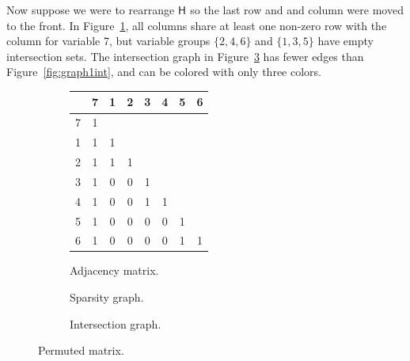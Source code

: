 \documentclass[jss]{jss}\usepackage[]{graphicx}\usepackage[]{color}
\newcommand{\hess}[2]{\mathsf{H}_{#1}#2}
\begin{document}
Now suppose we were to rearrange $\hess{}{}$ so the last row and
and column were moved to the front.  In Figure~\ref{fig:graph2adj}, all columns share at least one non-zero row with
the column for variable 7, but variable groups $\{2,4,6\}$ and
$\{1,3,5\}$ have empty intersection sets.  The intersection graph in
Figure~\ref{fig:graph2int} has fewer edges than Figure~\ref{fig:graph1int}, and can be colored
with only three colors.
\begin{figure}[ptb]
  \begin{subfigure}[m]{.32\textwidth}\centering
  \begin{tabular}{r|ccccccc}
   & 7&1&2&3&4&5&6\\
    \hline
    7& 1&&&&&&\\
    1&1&1&&&&&\\
    2&1&1&1&&&&\\
    3&1&0&0&1&&&\\
    4&1&0&0&1&1&&\\
    5&1&0&0&0&0&1&\\
    6&1&0&0&0&0&1&1
  \end{tabular}
  \caption{Adjacency matrix.}\label{fig:graph2adj}
\end{subfigure}
\begin{subfigure}[m]{.32\textwidth}\centering
\iftoggle{tikz}{
\begin{tikzpicture}
\tikzstyle{every node}=[draw, shape=circle]
\node at (0,0) [fill=green!20] (v7) {7};
\node at (0:1) [fill=blue!20] (v1) {1};
\node at (60:1) [fill=red!20] (v2) {2};
\node at (120:1) [fill=blue!20] (v3) {3};
\node at (180:1) [fill=red!20] (v4) {4};
\node at (240:1) [fill=blue!20] (v5) {5};
\node at (300:1) [fill=red!20] (v6) {6};
\draw
(v1) -- (v7)  (v2) -- (v7)  (v3) -- (v7)
(v4) -- (v7)  (v5) -- (v7)  (v6) -- (v7)
(v1) -- (v2)  (v3) -- (v4)  (v5) -- (v6);
\end{tikzpicture}
}{} %
\caption{Sparsity graph.}\label{fig:graph2pic}
\end{subfigure}
\begin{subfigure}[m]{.32\textwidth}\centering
\iftoggle{tikz}{
\begin{tikzpicture}
\tikzstyle{every node}=[draw, shape=circle]
\node at (0,0) [fill=green!20] (v7) {7};
\node at (0:1) [fill=blue!20] (v1) {1};
\node at (60:1) [fill=red!20] (v2) {2};
\node at (120:1) [fill=blue!20] (v3) {3};
\node at (180:1) [fill=red!20] (v4) {4};
\node at (240:1) [fill=blue!20] (v5) {5};
\node at (300:1) [fill=red!20] (v6) {6};
\draw
(v1) -- (v7)  (v2) -- (v7)  (v3) -- (v7)
(v4) -- (v7)  (v5) -- (v7)  (v6) -- (v7)
(v1) -- (v2)  (v3) -- (v4)  (v5) -- (v6);
\end{tikzpicture}
}{} %
\caption{Intersection graph.}\label{fig:graph2int}
\end{subfigure}
\caption{Permuted matrix.}\label{fig:graph2}
\end{figure}
\end{document}
